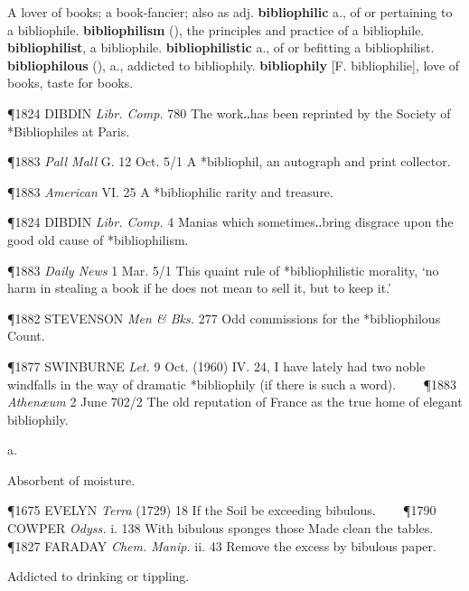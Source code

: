 \begin{description}[wide, labelwidth=!, labelindent=0pt]
\noindent
A lover of books; a book-fancier; also as adj. \textbf{bibliophilic} a., of or
pertaining to a bibliophile. 
\textbf{bibliophilism} (), the principles and practice of a bibliophile. 
\textbf{bibliophilist}, a bibliophile. 
\textbf{bibliophilistic} a., of or befitting a bibliophilist. 
\textbf{bibliophilous} (), a., addicted to bibliophily. 
\textbf{bibliophily} [F. bibliophilie], love of books, taste for books.

\P 1824 DIBDIN  \textit{Libr. Comp.} 780 The work‥has been reprinted by the Society of *Bibliophiles at Paris.

\P 1883 \textit{Pall Mall} G. 12 Oct. 5/1 A *bibliophil, an autograph and print collector.

\P 1883 \textit{American}  VI. 25 A *bibliophilic rarity and treasure.

\P 1824 DIBDIN  \textit{Libr. Comp.} 4 Manias which sometimes‥bring disgrace upon the good old cause of *bibliophilism.

\P 1883  \textit{Daily News} 1 Mar. 5/1 This quaint rule of *bibliophilistic morality, ‘no harm in stealing a book if he does not mean to sell it, but to keep it.’

\P 1882 STEVENSON  \textit{Men \& Bks.} 277 Odd commissions for the *bibliophilous Count.

\P 1877 SWINBURNE  \textit{Let.} 9 Oct. (1960) IV. 24, I have lately had two noble windfalls in the way of dramatic *bibliophily (if there is such a word).    
\P 1883 \textit{Athenæum}  2 June 702/2 The old reputation of France as the true home of elegant bibliophily.


 a.

\noindent {}

\vspace{-0.3cm}

\begin{myenumerate}

 Absorbent of moisture.

\P 1675 EVELYN  \textit{Terra} (1729) 18 If the Soil be exceeding bibulous.    
\P 1790 COWPER  \textit{Odyss.} i. 138 With bibulous sponges those Made clean the tables.    
\P 1827 FARADAY  \textit{Chem. Manip.} ii. 43 Remove the excess by bibulous paper.

 Addicted to drinking or tippling.


\end{myenumerate}
\end{description}
